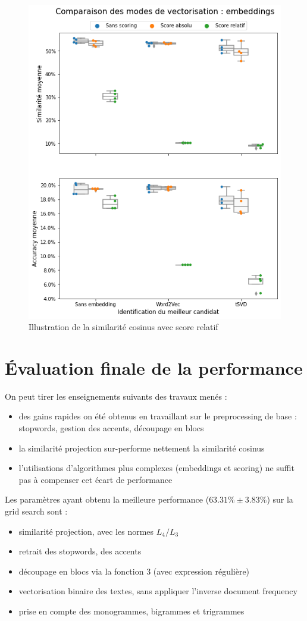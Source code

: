             \begin{figure}[htbp]
                \begin{center}
                \includegraphics[width=0.6\linewidth]{img/tuning_embedding.png}
                \end{center}
                \caption{Illustration de la similarité cosinus avec score relatif}
                \label{fig:tuning_embedding}
            \end{figure}

            \section{\'{E}valuation finale de la performance}

            On peut tirer les enseignements suivants des travaux menés :
            \begin{itemize}
                \item des gains rapides on été obtenus en travaillant sur le preprocessing de base : stopwords, gestion des accents, découpage en blocs
                \item la similarité projection sur-performe nettement la similarité cosinus
                \item l'utilisations d'algorithmes plus complexes (embeddings et scoring) ne suffit pas à compenser cet écart de performance
            \end{itemize}

            Les paramètres ayant obtenu la meilleure performance ($63.31\% \pm 3.83\%$) sur la grid search sont : 
            \begin{itemize}
                \item similarité projection, avec les normes $L_{4}/L_{3}$
                \item retrait des stopwords, des accents
                \item découpage en blocs via la fonction 3 (avec expression régulière)
                \item vectorisation binaire des textes, sans appliquer l'inverse document frequency
                \item prise en compte des monogrammes, bigrammes et trigrammes
            \end{itemize}

